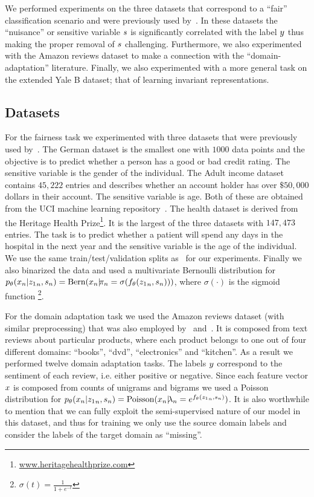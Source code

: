 We performed experiments on the three datasets that correspond to a ``fair'' classification scenario and were previously used by~\cite{zemel2013learning}. In these datasets the ``nuisance'' or sensitive variable $\*s$ is significantly correlated with the label $\*y$ thus making the proper removal of $\*s$ challenging. Furthermore, we also experimented with the Amazon reviews dataset to make a connection with the ``domain-adaptation'' literature. Finally, we also experimented with a more general task on the extended Yale B dataset; that of learning invariant representations. 

\subsection{Datasets}
For the fairness task we experimented with three datasets that were previously used by~\citet{zemel2013learning}. The German dataset is the smallest one with $1000$ data points and the objective is to predict whether a person has a good or bad credit rating. The sensitive variable is the gender of the individual. The Adult income dataset contains $45,222$ entries and describes whether an account holder has over $\$50,000$ dollars in their account. The sensitive variable is age. Both of these are obtained from the UCI machine learning repository~\citep{UCI}. The health dataset is derived from the Heritage Health Prize\footnote{\url{www.heritagehealthprize.com}}. It is the largest of the three datasets with $147,473$ entries. The task is to predict whether a patient will spend any days in the hospital in the next year and the sensitive variable is the age of the individual. We use the same train/test/validation splits as~\citet{zemel2013learning} for our experiments. Finally we also binarized the data and used a multivariate Bernoulli distribution for $p_\theta(\*x_n|{\*z_1}_n,\*s_n) = \text{Bern}(\*x_n | \!\pi_n = \sigma(f_\theta({\*z_1}_n, \*s_n)))$, where $\sigma(\cdot)$ is the sigmoid function \footnote{$\sigma(t) = \frac{1}{1 + e^{-t}}$}.

For the domain adaptation task we used the Amazon reviews dataset (with similar preprocessing) that was also employed by~\citet{chen2012marginalized} and~\citet{2015arXiv150507818G}. It is composed from text reviews about particular products, where each product belongs to one out of four different domains: ``books'', ``dvd'', ``electronics'' and ``kitchen''. As a result we performed twelve domain adaptation tasks. The labels $\*y$ correspond to the sentiment of each review, i.e. either positive or negative. Since each feature vector $\*x$ is composed from counts of unigrams and bigrams we used a Poisson distribution for $p_\theta(\*x_n|{\*z_1}_n, \*s_n) = \text{Poisson}(\*x_n | \!\lambda_n = e^{f_\theta({\*z_1}_n, \*s_n)})$. It is also worthwhile to mention that we can fully exploit the semi-supervised nature of our model in this dataset, and thus for training we only use the source domain labels and consider the labels of the target domain as ``missing''.

